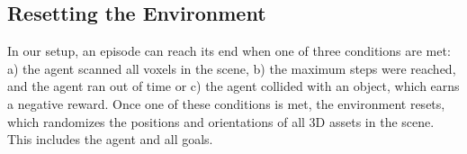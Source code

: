 



\subsection{Resetting the Environment}
In our setup, an episode can reach its end when one of three conditions are met: a) the agent scanned all voxels in the scene, b) the maximum steps were reached, and the agent ran out of time or c) the agent collided with an object, which earns a negative reward. Once one of these conditions is met, the environment resets, which randomizes the positions and orientations of all 3D assets in the scene. This includes the agent and all goals.

